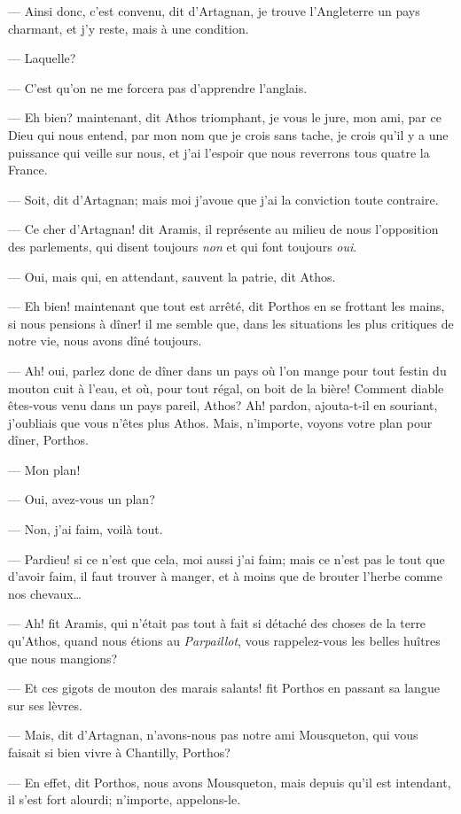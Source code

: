 — Ainsi donc, c'est convenu, dit d'Artagnan, je trouve l'Angleterre un pays charmant, et j'y reste, mais à une condition.

— Laquelle?

— C'est qu'on ne me forcera pas d'apprendre l'anglais.

— Eh bien? maintenant, dit Athos triomphant, je vous le jure, mon ami, par ce Dieu qui nous entend, par mon nom que je crois sans tache, je crois qu'il y a une puissance qui veille sur nous, et j'ai l'espoir que nous reverrons tous quatre la France.

— Soit, dit d'Artagnan; mais moi j'avoue que j'ai la conviction toute contraire.

— Ce cher d'Artagnan! dit Aramis, il représente au milieu de nous l'opposition des parlements, qui disent toujours \textit{non} et qui font toujours \textit{oui}.

— Oui, mais qui, en attendant, sauvent la patrie, dit Athos.

— Eh bien! maintenant que tout est arrêté, dit Porthos en se frottant les mains, si nous pensions à dîner! il me semble que, dans les situations les plus critiques de notre vie, nous avons dîné toujours.

— Ah! oui, parlez donc de dîner dans un pays où l'on mange pour tout festin du mouton cuit à l'eau, et où, pour tout régal, on boit de la bière! Comment diable êtes-vous venu dans un pays pareil, Athos? Ah! pardon, ajouta-t-il en souriant, j'oubliais que vous n'êtes plus Athos. Mais, n'importe, voyons votre plan pour dîner, Porthos.

— Mon plan!

— Oui, avez-vous un plan?

— Non, j'ai faim, voilà tout.

— Pardieu! si ce n'est que cela, moi aussi j'ai faim; mais ce n'est pas le tout que d'avoir faim, il faut trouver à manger, et à moins que de brouter l'herbe comme nos chevaux\dots

— Ah! fit Aramis, qui n'était pas tout à fait si détaché des choses de la terre qu'Athos, quand nous étions au \textit{Parpaillot}, vous rappelez-vous les belles huîtres que nous mangions?

— Et ces gigots de mouton des marais salants! fit Porthos en passant sa langue sur ses lèvres.

— Mais, dit d'Artagnan, n'avons-nous pas notre ami Mousqueton, qui vous faisait si bien vivre à Chantilly, Porthos?

— En effet, dit Porthos, nous avons Mousqueton, mais depuis qu'il est intendant, il s'est fort alourdi; n'importe, appelons-le.

